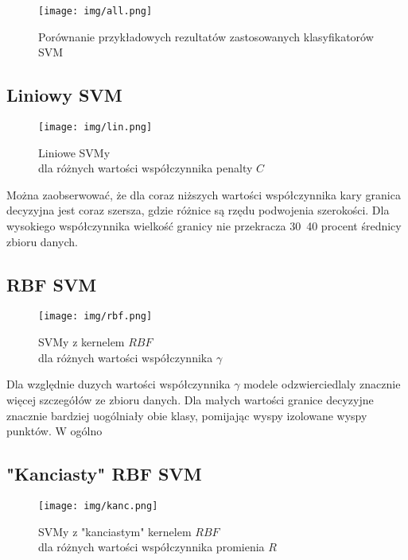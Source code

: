 \begin{figure}[H]
        \centering
        \texttt{[image: img/all.png]}
        \caption{Porównanie przykładowych rezultatów zastosowanych klasyfikatorów SVM}
\end{figure}

\subsection{Liniowy SVM}

\begin{figure}[H]
        \centering
        \texttt{[image: img/lin.png]}
        \caption{Liniowe SVMy\\dla różnych wartości współczynnika penalty $C$}
\end{figure}

Można zaobserwować, że dla coraz niższych wartości współczynnika kary granica decyzyjna jest coraz szersza, gdzie różnice są rzędu podwojenia szerokości. Dla wysokiego współczynnika wielkość granicy nie przekracza 30~40 procent średnicy zbioru danych.

\subsection{RBF SVM}

\begin{figure}[H]
        \centering
        \texttt{[image: img/rbf.png]}
        \caption{SVMy z kernelem $RBF$\\dla różnych wartości współczynnika $\gamma$}
\end{figure}

Dla względnie duzych wartości współczynnika $\gamma$ modele odzwierciedlaly znacznie więcej szczegółów ze zbioru danych. Dla małych wartości granice decyzyjne znacznie bardziej uogólniały obie klasy, pomijając wyspy izolowane wyspy punktów. W ogólno

\subsection{"Kanciasty" RBF SVM}

\begin{figure}[H]
        \centering
        \texttt{[image: img/kanc.png]}
        \caption{SVMy z "kanciastym" kernelem $RBF$\\dla różnych wartości współczynnika promienia $R$}
\end{figure}

